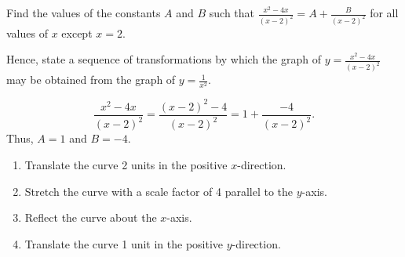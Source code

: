 \begin{problem}
    Find the values of the constants $A$ and $B$ such that $\frac{x^2-4x}{(x-2)^2} = A + \frac{B}{(x-2)^2}$ for all values of $x$ except $x=2$.

    Hence, state a sequence of transformations by which the graph of $y = \frac{x^2-4x}{(x-2)^2}$ may be obtained from the graph of $y = \frac1{x^2}$.
\end{problem}
\begin{solution}
    \[\frac{x^2-4x}{(x-2)^2} = \frac{(x-2)^2 - 4}{(x-2)^2} = 1 + \frac{- 4}{(x-2)^2}.\] Thus, $A = 1$ and $B = -4$.

    \begin{center}
    \end{center}

    \renewcommand{\theenumi}{\arabic{enumi}}%
    \begin{enumerate}
        \item Translate the curve 2 units in the positive $x$-direction.
        \item Stretch the curve with a scale factor of 4 parallel to the $y$-axis.
        \item Reflect the curve about the $x$-axis.
        \item Translate the curve 1 unit in the positive $y$-direction.
    \end{enumerate}
    \renewcommand{\theenumi}{(\alph{enumi})}
\end{solution}

